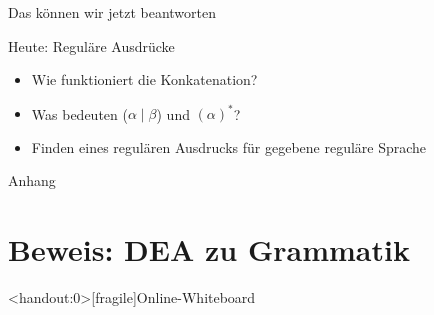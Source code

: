 \begin{frame}[fragile]{Das können wir jetzt beantworten}
    \begin{alertblock}{Heute: Reguläre Ausdrücke}
        \begin{itemize}
            \item Wie funktioniert die Konkatenation?
            \item Was bedeuten ($\alpha \mid \beta$) und $(\alpha)^*$?
            \item Finden eines regulären Ausdrucks für gegebene reguläre Sprache
        \end{itemize}
    \end{alertblock}
\end{frame}








\appendix
\begin{frame}[standout]
    Anhang
\end{frame}

\section{Beweis: DEA zu Grammatik}




\begin{frame}<handout:0>[fragile]{Online-Whiteboard}
    \phantom{text}
\end{frame}


